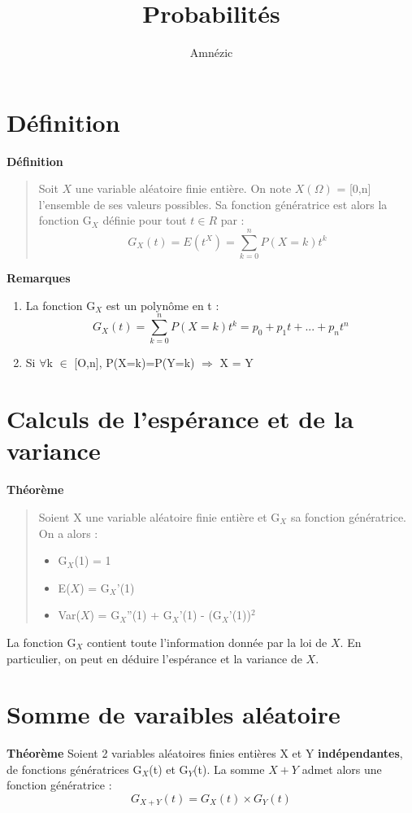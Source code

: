 \documentclass{article}
\author{Amnézic}
\date{}
\title{Probabilités}
\begin{document}
\maketitle
\newpage
\tableofcontents
\newpage

\section{Définition}
\textbf{Définition}
\begin{quote}
    Soit $X$ une variable aléatoire finie entière. On note $X(\Omega)$ = [0,n] l'ensemble de ses valeurs possibles. Sa fonction génératrice est alors la fonction G$_{X}$ définie pour tout $t \in R$ par :
    \[ G_{X}(t) = E(t^{X}) = \sum_{k=0}^{n} P(X=k)t^{k} \]
\end{quote}

\noindent \textbf{Remarques}
\begin{enumerate}
    \item La fonction G$_{X}$ est un polynôme en t : \[ G_{X}(t) = \sum_{k=0}^{n} P(X=k)t^{k} = p_{0} + p_{1}t + ... + p_{n}t^{n} \]
    \item Si $\forall$k $\in$ [O,n], P(X=k)=P(Y=k) $\Longrightarrow$ X = Y
\end{enumerate}

\section{Calculs de l'espérance et de la variance}
\textbf{Théorème}
\begin{quote}
    Soient X une variable aléatoire finie entière et G$_{X}$ sa fonction génératrice. On a alors :
    \begin{itemize}
        \item G$_{X}$(1) = 1
        \item E($X$) = G$_{X}$'(1)
        \item Var($X$) = G$_{X}$''(1) + G$_{X}$'(1) - (G$_{X}$'(1))$^{2}$
    \end{itemize}
\end{quote}

La fonction G$_{X}$ contient toute l'information donnée par la loi de $X$. En particulier, on peut en déduire l'espérance et la variance de $X$.

\section{Somme de varaibles aléatoire}
\textbf{Théorème}
Soient 2 variables aléatoires finies entières X et Y \textbf{indépendantes}, de fonctions génératrices G$_{X}$(t) et G$_{Y}$(t). La somme $X + Y$ admet alors une fonction génératrice :
\[ G_{X+Y}(t) = G_{X}(t) \times G_{Y}(t) \]
\end{document}
